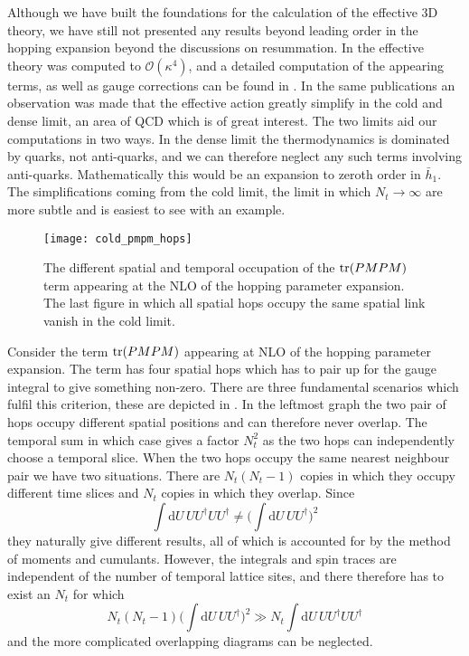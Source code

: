 Although we have built the foundations for the calculation of the effective 3D
theory, we have still not presented any results beyond leading order in the
hopping expansion beyond the discussions on resummation. In
\citep{Langelage:2014vpa} the effective theory was computed to
$\mathcal{O}(\kappa^4)$, and a detailed computation of the appearing terms, as
well as gauge corrections can be found in \citep{Neuman:2015zb}. In the same
publications an observation was made that the effective action greatly simplify
in the cold and dense limit, an area of QCD which is of great interest. The two
limits aid our computations in two ways. In the dense limit the thermodynamics
is dominated by quarks, not anti-quarks, and we can therefore neglect any such
terms involving anti-quarks. Mathematically this would be an expansion to
zeroth order in $\bar{h}_1$. The simplifications coming from the cold limit, the
limit in which $N_t \to \infty$ are more subtle and is easiest to see with an
example.

\begin{figure}
  {\centering
    \texttt{[image: cold\_pmpm\_hops]}\par}
  \caption{The different spatial and temporal occupation of the $\operatorname{tr}(PMPM)$ term
    appearing at the NLO of the hopping parameter expansion. The last figure in
    which all spatial hops occupy the same spatial link vanish in the cold
    limit.}
  \label{fig:pmpm-hop-variants}
\end{figure}

Consider the term $\operatorname{tr}(PMPM)$ appearing at NLO of the hopping parameter
expansion. The term has four spatial hops which has to pair up for the gauge
integral to give something non-zero. There are three fundamental scenarios
which fulfil this criterion, these are depicted in .
In the leftmost graph the two pair of hops occupy different spatial positions
and can therefore never overlap. The temporal sum in which case gives a factor
$N_t^2$ as the two hops can independently choose a temporal slice. When the two
hops occupy the same nearest neighbour pair we have two situations. There are
$N_t(N_t-1)$ copies in which they occupy different time slices and $N_t$ copies
in which they overlap. Since
%
\begin{equation}
  \int \mathrm{d} U\, U U^{\dagger} U U^{\dagger} \neq
  \bigg(\int \mathrm{d} U\, U U^{\dagger} \bigg)^2
\end{equation}
%
they naturally give different results, all of which is accounted for by the
method of moments and cumulants. However, the integrals and spin traces are
independent of the number of temporal lattice sites, and there therefore has to
exist an $N_t$ for which
%
\begin{equation}
  N_t(N_t-1) \bigg( \int \mathrm{d} U \, U U^{\dagger} \bigg)^2 \gg
  N_t \int \mathrm{d} U \, U U^{\dagger} U U^{\dagger}
\end{equation}
%
and the more complicated overlapping diagrams can be neglected.

